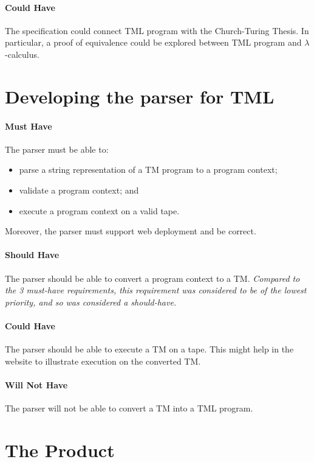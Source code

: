 \paragraph{Could Have} The specification could connect TML program with the Church-Turing Thesis. In particular, a proof of equivalence could be explored between TML program and $\lambda$-calculus.

\section{Developing the parser for TML}

\paragraph{Must Have} The parser must be able to:
\begin{itemize}
    \item parse a string representation of a TM program to a program context;
    \item validate a program context; and 
    \item execute a program context on a valid tape.
\end{itemize}
Moreover, the parser must support web deployment and be correct.

\paragraph{Should Have} The parser should be able to convert a program context to a TM. \textit{Compared to the 3 must-have requirements, this requirement was considered to be of the lowest priority, and so was considered a should-have.}

\paragraph{Could Have} The parser should be able to execute a TM on a tape. This might help in the website to illustrate execution on the converted TM.

\paragraph{Will Not Have} The parser will not be able to convert a TM into a TML program.

\section{The Product}


